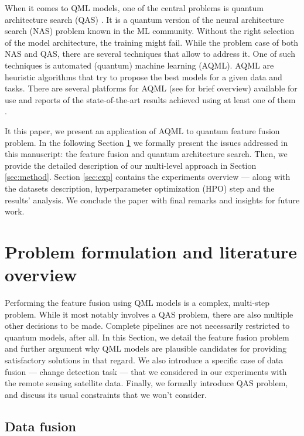 \documentclass[runningheads]{llncs}
\begin{document}
When it comes to QML models, one of the central problems is quantum architecture search (QAS) \cite{QAS}. It is a
quantum version of the neural architecture search (NAS) problem known in the ML community. Without the right
selection of the model architecture, the training might fail. While the problem case of both NAS and QAS, there are
several techniques that allow to address it. One of such techniques is automated (quantum) machine learning (AQML).
AQML are heuristic algorithms that try to propose the best models for a given data and tasks. There are several
platforms for AQML (see \cite{Rybotycki_2025} for brief overview) available for use and reports of the
state-of-the-art results achieved using at least one of them \cite{AQML_Exp}.

It this paper, we present an application of AQML to quantum feature fusion problem. In the following Section
\ref{sec:problem_formulation} we formally present the issues addressed in this manuscript: the feature fusion and
quantum architecture search. Then, we provide the detailed description of our multi-level approach in Section
\ref{sec:method}. Section \ref{sec:exp} contains the experiments overview --- along with the datasets description,
hyperparameter optimization (HPO) step and the results' analysis. We conclude the paper with final remarks and
insights for future work.

\section{Problem formulation and literature overview}
\label{sec:problem_formulation}


Performing the feature fusion using QML models is a complex, multi-step problem. While it most notably involves a QAS problem,
there are also multiple other decisions to be made. Complete pipelines are not necessarily restricted
to quantum models, after all. In this Section, we detail the feature fusion problem and further argument why
QML models are plausible candidates for providing satisfactory solutions in that regard. We also introduce a
specific case of data fusion --- change detection task --- that we considered in our experiments with the remote
sensing satellite data. Finally, we formally introduce QAS problem, and discuss its usual constraints that we won't
consider.

\subsection{Data fusion}
\end{document}
